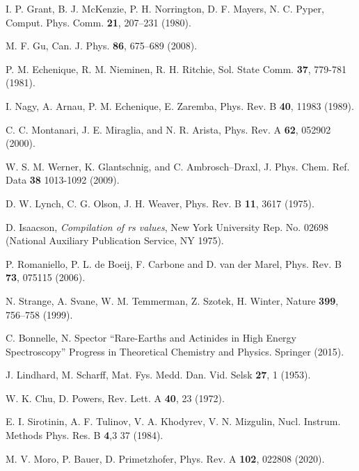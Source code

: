 \begin{thebibliography}{9}
I. P. Grant, B. J. McKenzie, P. H. Norrington, D. F. Mayers, N. C. Pyper,
Comput. Phys. Comm. \textbf{21}, 207--231 (1980).

M. F. Gu,
Can. J. Phys. \textbf{86}, 675--689 (2008).

P. M. Echenique, R. M. Nieminen, R. H. Ritchie, 
Sol. State Comm. \textbf{37}, 779-781 (1981).

I. Nagy, A. Arnau, P. M. Echenique, E. Zaremba, 
Phys. Rev. B \textbf{40}, 11983 (1989).

C. C. Montanari, J. E. Miraglia, and N. R. Arista, 
Phys. Rev. A \textbf{62}, 052902 (2000).

W. S. M. Werner, K. Glantschnig, and C. Ambrosch--Draxl,
J. Phys. Chem. Ref. Data \textbf{38} 1013-1092 (2009).

D. W. Lynch, C. G. Olson, J. H. Weaver,
Phys. Rev. B \textbf{11}, 3617 (1975).

D. Isaacson,
\textit{Compilation of rs values}, New York University Rep. No. 02698
(National Auxiliary Publication Service, NY 1975).

P. Romaniello, P. L. de Boeij, F. Carbone and D. van der Marel,
Phys. Rev. B \textbf{73}, 075115 (2006).

N. Strange, A. Svane, W. M. Temmerman, Z. Szotek, H. Winter,
Nature \textbf{399}, 756--758 (1999).

C. Bonnelle, N. Spector
``Rare-Earths and Actinides in High Energy Spectroscopy'' 
Progress in Theoretical Chemistry and Physics. Springer (2015).

J. Lindhard, M. Scharff,  
Mat. Fys. Medd. Dan. Vid. Selsk  \textbf{27}, 1 (1953).

W. K. Chu, D. Powers, 
Rev. Lett. A \textbf{40}, 23 (1972).

E. I. Sirotinin, A. F. Tulinov, V. A. Khodyrev, V. N. Mizgulin, 
Nucl. Instrum. Methods Phys. Res. B \textbf{4},3 37 (1984).

M. V. Moro, P. Bauer, D. Primetzhofer,
Phys. Rev. A \textbf{102}, 022808 (2020).


\end{thebibliography}
